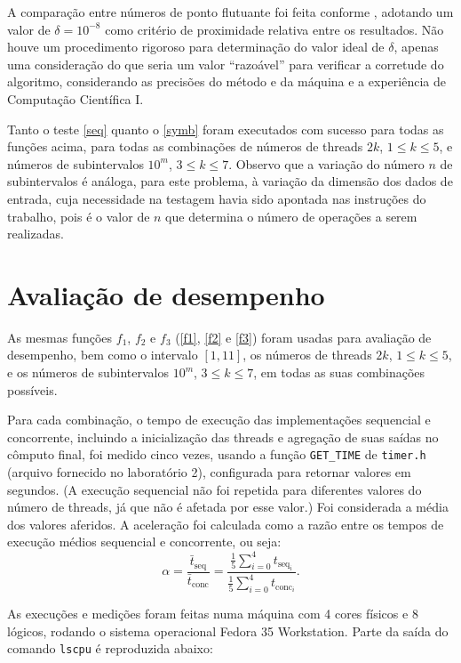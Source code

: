 \documentclass{article}
\begin{document}
  A comparação entre números de ponto flutuante foi feita conforme \cite{float}, adotando um valor de $\delta = 10^{-8}$ como critério de proximidade relativa entre os resultados. Não houve um procedimento rigoroso para determinação do valor ideal de $\delta$, apenas uma consideração do que seria um valor ``razoável'' para verificar a corretude do algoritmo, considerando as precisões do método e da máquina e a experiência de Computação Científica I. 
  
  Tanto o teste \ref{seq} quanto o \ref{symb} foram executados com sucesso para todas as funções acima, para todas as combinações de números de threads $2k$, $1 \leq k \leq 5$, e números de subintervalos $10^m$, $3 \leq k \leq 7$. Observo que a variação do número $n$ de subintervalos é análoga, para este problema, à variação da dimensão dos dados de entrada, cuja necessidade na testagem havia sido apontada nas instruções do trabalho, pois é o valor de $n$ que determina o número de operações a serem realizadas.

  \section{Avaliação de desempenho} \label{perf}

  As mesmas funções $f_1$, $f_2$ e $f_3$ (\eqref{f1}, \eqref{f2} e \eqref{f3}) foram usadas para avaliação de desempenho, bem como o intervalo $[1, 11]$, os números de threads $2k$, $1 \leq k \leq 5$, e os números de subintervalos $10^m$, $3 \leq k \leq 7$, em todas as suas combinações possíveis.

  Para cada combinação, o tempo de execução das implementações sequencial e concorrente, incluindo a inicialização das threads e agregação de suas saídas no cômputo final, foi medido cinco vezes, usando a função \texttt{GET\_TIME} de \texttt{timer.h} (arquivo fornecido no laboratório 2), configurada para retornar valores em segundos. (A execução sequencial não foi repetida para diferentes valores do número de threads, já que não é afetada por esse valor.) Foi considerada a média dos valores aferidos. A aceleração foi calculada como a razão entre os tempos de execução médios sequencial e concorrente, ou seja:
  \begin{equation} \label{acc}
    \alpha = \frac{\bar{t}_{\text{seq}}}{\bar{t}_{\text{conc}}} = \frac{\frac{1}{5} \sum_{i=0}^4 t_{\text{seq}_i}}{\frac{1}{5} \sum_{i=0}^4 t_{\text{conc}_i}}.
  \end{equation}

  As execuções e medições foram feitas numa máquina com 4 cores físicos e 8 lógicos, rodando o sistema operacional Fedora 35 Workstation. Parte da saída do comando \texttt{lscpu} é reproduzida abaixo:
\end{document}
